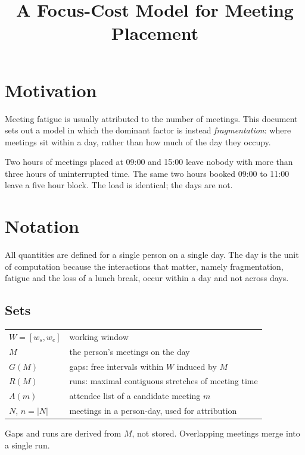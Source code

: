 \documentclass[11pt]{article}
\title{A Focus-Cost Model for Meeting Placement}
\author{}
\date{}
\begin{document}
\maketitle

\section{Motivation}

Meeting fatigue is usually attributed to the number of meetings. This
document sets out a model in which the dominant factor is instead
\emph{fragmentation}: where meetings sit within a day, rather than how much
of the day they occupy.

Two hours of meetings placed at 09:00 and 15:00 leave nobody with more than
three hours of uninterrupted time. The same two hours booked 09:00 to 11:00
leave a five hour block. The load is identical; the days are not.

\section{Notation}

All quantities are defined for a single person on a single day. The day is
the unit of computation because the interactions that matter, namely
fragmentation, fatigue and the loss of a lunch break, occur within a day and
not across days.

\subsection*{Sets}

\begin{tabular}{@{}ll@{}}
\toprule
$W = [w_s, w_e]$ & working window \\
$M$ & the person's meetings on the day \\
$G(M)$ & gaps: free intervals within $W$ induced by $M$ \\
$R(M)$ & runs: maximal contiguous stretches of meeting time \\
$A(m)$ & attendee list of a candidate meeting $m$ \\
$N$, $n = |N|$ & meetings in a person-day, used for attribution \\
\bottomrule
\end{tabular}

\medskip

Gaps and runs are derived from $M$, not stored. Overlapping meetings merge
into a single run.
\end{document}
